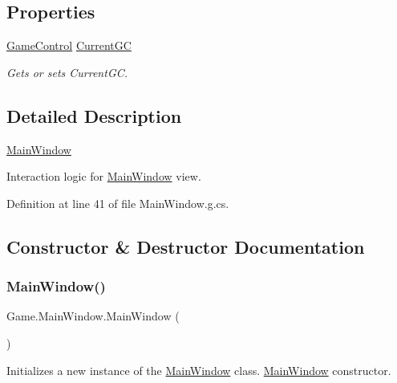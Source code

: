 \subsection*{Properties}
\begin{DoxyCompactItemize}
\item 
\mbox{\hyperlink{class_game_1_1_game_control}{Game\+Control}} \mbox{\hyperlink{class_game_1_1_main_window_a16813a457581b1f200ab2eeb6d74e0a1}{Current\+GC}}
\begin{DoxyCompactList}\small\item\em Gets or sets Current\+GC. \end{DoxyCompactList}\end{DoxyCompactItemize}


\subsection{Detailed Description}
\mbox{\hyperlink{class_game_1_1_main_window}{Main\+Window}} 

Interaction logic for \mbox{\hyperlink{class_game_1_1_main_window}{Main\+Window}} view.

Definition at line 41 of file Main\+Window.\+g.\+cs.



\subsection{Constructor \& Destructor Documentation}
\mbox{\label{class_game_1_1_main_window_a525da08523cd401440097c57b07f4bf2}} 
\subsubsection{\texorpdfstring{MainWindow()}{MainWindow()}}
{\footnotesize\ttfamily Game.\+Main\+Window.\+Main\+Window (\begin{DoxyParamCaption}{ }\end{DoxyParamCaption})}



Initializes a new instance of the \mbox{\hyperlink{class_game_1_1_main_window}{Main\+Window}} class. \mbox{\hyperlink{class_game_1_1_main_window}{Main\+Window}} constructor. 



